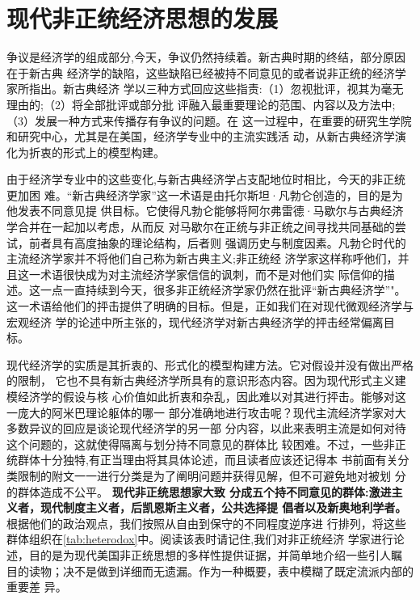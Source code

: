 \chapter{现代非正统经济思想的发展}

争议是经济学的组成部分,今天，争议仍然持续着。新古典时期的终结，部分原因在于新古典
经济学的缺陷，这些缺陷已经被持不同意见的或者说非正统的经济学家所指出。新古典经济
学以三种方式回应这些指责:（1）忽视批评，视其为毫无理由的;（2）将全部批评或部分批
评融入最重要理论的范围、内容以及方法中;（3）发展一种方式来传播存有争议的问题。在
这一过程中，在重要的研究生学院和研究中心，尤其是在美国，经济学专业中的主流实践活
动，从新古典经济学演化为折衷的形式上的模型构建。

由于经济学专业中的这些变化,与新古典经济学占支配地位时相比，今天的非正统更加困
难。“新古典经济学家”这一术语是由托尔斯坦·凡勃仑创造的，目的是为他发表不同意见提
供目标。它使得凡勃仑能够将阿尔弗雷德·马歇尔与古典经济学合并在一起加以考虑，从而反
对马歇尔在正统与非正统之间寻找共同基础的尝试，前者具有高度抽象的理论结构，后者则
强调历史与制度因素。凡勃仑时代的主流经济学家并不将他们自己称为新古典主义;非正统经
济学家这样称呼他们，并且这一术语很快成为对主流经济学家信信的讽刺，而不是对他们实
际信仰的描述。这一点一直持续到今天，很多非正统经济学家仍然在批评“新古典经济学”"。
这一术语给他们的抨击提供了明确的目标。但是，正如我们在对现代微观经济学与宏观经济
学的论述中所主张的，现代经济学对新古典经济学的抨击经常偏离目标。

现代经济学的实质是其折衷的、形式化的模型构建方法。它对假设并没有做出严格的限制，
它也不具有新古典经济学所具有的意识形态内容。因为现代形式主义建模经济学的假设与核
心价值如此折衷和杂乱，因此难以对其进行抨击。能够对这一庞大的阿米巴理论躯体的哪一
部分准确地进行攻击呢？现代主流经济学家对大多数异议的回应是谈论现代经济学的另一部
分内容，以此来表明主流是如何对待这个问题的，这就使得隔离与划分持不同意见的群体比
较困难。不过，一些非正统群体十分独特,有正当理由将其具体论述，而且读者应该还记得本
书前面有关分类限制的附文一一进行分类是为了阐明问题并获得见解，但不可避免地对被划
分的群体造成不公平。\enlargethispage{\baselineskip} \textbf{现代非正统思想家大致
  分成五个持不同意见的群体:激进主义者，现代制度主义者，后凯恩斯主义者，公共选择提
  倡者以及新奥地利学者。}根据他们的政治观点，我们按照从自由到保守的不同程度逆序进
行排列，将这些群体组织在\cref{tab:heterodox}中。阅读该表时请记住,我们对非正统经济
学家进行论述，目的是为现代美国非正统思想的多样性提供证据，并简单地介绍一些引人瞩
目的读物；决不是做到详细而无遗漏。作为一种概要，表中模糊了既定流派内部的重要差
异。
\clearpage


